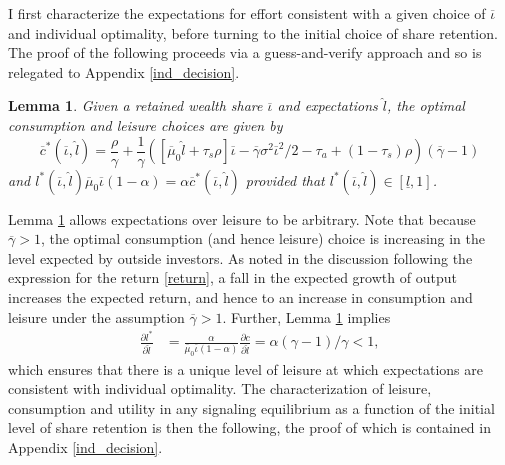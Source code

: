 \documentclass[11pt]{article}
\theoremstyle{plain}
\newtheorem{lemma}[thm]{Lemma}
\begin{document}
I first characterize the expectations for effort consistent with a given choice of $\overline{\iota}$ and individual optimality, before turning to the initial choice of share retention. The proof of the following proceeds via a guess-and-verify approach and so is relegated to Appendix \ref{ind_decision}. 

\begin{lemma} \label{FIXiotal}
Given a retained wealth share $\overline{\iota}$ and expectations $\hat{l}$, the optimal consumption and leisure choices are given by
$$
\overline{c}^*(\overline{\iota}, \hat{l}) = \frac{\rho}{\gamma} + \frac{1}{\gamma}{\left([\overline{\mu}_0\hat{l} + \tau_s\rho]\overline{\iota} - \overline{\gamma}\sigma^2\overline{\iota}^2/2 - \tau_a + (1-\tau_s)\rho\right)}(\overline{\gamma} - 1) 
$$
and $l^*(\overline{\iota}, \hat{l})\overline{\mu}_0\overline{\iota}(1-\alpha) = \alpha \overline{c}^*(\overline{\iota}, \hat{l})$
provided that $l^*(\overline{\iota}, \hat{l}) \in [\underline{l}, 1]$. 
\end{lemma}


Lemma \ref{FIXiotal} allows expectations over leisure to be arbitrary. Note that because $\overline{\gamma}>1$, the optimal consumption (and hence leisure) choice is increasing in the level expected by outside investors. As noted in the discussion following the expression for the return \eqref{return}, a fall in the expected growth of output increases the expected return, and hence to an increase in consumption and leisure under the assumption $\overline{\gamma}>1$. Further, Lemma \ref{FIXiotal} implies
\begin{align*} %
\frac{\partial l^*}{\partial \hat{l}} & = \frac{\alpha }{\overline{\mu}_0\overline{\iota}(1-\alpha)} \frac{\partial c}{\partial \hat{l}} = \alpha (\gamma-1) /\gamma < 1, 
\end{align*}
which ensures that there is a unique level of leisure at which expectations are consistent with individual optimality. The characterization of leisure, consumption and utility in any signaling equilibrium as a function of the initial level of share retention is then the following, the proof of which is contained in Appendix \ref{ind_decision}.
\end{document}
